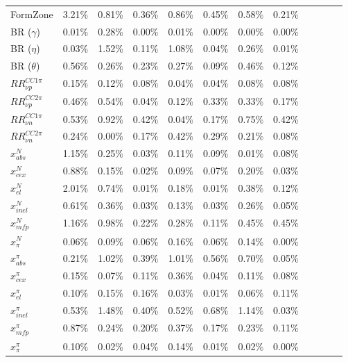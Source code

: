 \begin{table*}
\begin{tabular}{| l | l | l | l | l | l | l | l | l | l | l | l | }
FormZone  & 3.21\% &  0.81\% &  0.36\% &  0.86\% &  0.45\% &  0.58\% &  0.21\% \\
BR ($\gamma$) & 0.01\% &  0.28\% &  0.00\% &  0.01\% &  0.00\% &  0.00\% &  0.00\% \\
BR ($\eta$) &0.03\% &  1.52\% &  0.11\% &  1.08\% &  0.04\% &  0.26\% &  0.01\% \\
BR ($\theta$) & 0.56\% &  0.26\% &  0.23\% &  0.27\% &  0.09\% &  0.46\% &  0.12\% \\ \hline

$RR_{\nu p}^{CC1\pi}$ & 0.15\% &  0.12\% &  0.08\% &  0.04\% &  0.04\% &  0.08\% &  0.08\% \\ 
$RR_{\nu p}^{CC2\pi}$ & 0.46\% &  0.54\% &  0.04\% &  0.12\% &  0.33\% &  0.33\% &  0.17\% \\
$RR_{\nu n}^{CC1\pi}$ & 0.53\% &  0.92\% &  0.42\% &  0.04\% &  0.17\% &  0.75\% &  0.42\% \\ 
$RR_{\nu n}^{CC2\pi}$ & 0.24\% &  0.00\% &  0.17\% &  0.42\% &  0.29\% &  0.21\% &  0.08\% \\ \hline

$x_{abs}^{N}$ & 1.15\% &  0.25\% &  0.03\% &  0.11\% &  0.09\% &  0.01\% &  0.08\%\\
$x_{cex}^{N}$ & 0.88\% &  0.15\% &  0.02\% &  0.09\% &  0.07\% &  0.20\% &  0.03\% \\
$x_{el}^{N}$ & 2.01\% &  0.74\% &  0.01\% &  0.18\% &  0.01\% &  0.38\% &  0.12\% \\
$x_{inel}^{N}$ & 0.61\% &  0.36\% &  0.03\% &  0.13\% &  0.03\% &  0.26\% &  0.05\% \\
$x_{mfp}^{N}$ & 1.16\% &  0.98\% &  0.22\% &  0.28\% &  0.11\% &  0.45\% &  0.45\% \\
$x_{\pi}^{N}$ & 0.06\% &  0.09\% &  0.06\% &  0.16\% &  0.06\% &  0.14\% &  0.00\%  \\
$x_{abs}^{\pi}$ & 0.21\% &  1.02\% &  0.39\% &  1.01\% &  0.56\% &  0.70\% &  0.05\% \\
$x_{cex}^{\pi}$ & 0.15\% &  0.07\% &  0.11\% &  0.36\% &  0.04\% &  0.11\% &  0.08\% \\
$x_{el}^{\pi}$ &0.10\% &  0.15\% &  0.16\% &  0.03\% &  0.01\% &  0.06\% &  0.11\%\\
$x_{inel}^{\pi}$ & 0.53\% &  1.48\% &  0.40\% &  0.52\% &  0.68\% &  1.14\% &  0.03\%  \\
$x_{mfp}^{\pi}$ & 0.87\% &  0.24\% &  0.20\% &  0.37\% &  0.17\% &  0.23\% &  0.11\% \\
$x_{\pi}^{\pi}$ & 0.10\% &  0.02\% &  0.04\% &  0.14\% &  0.01\% &  0.02\% &  0.00\% \\
\hline
\end{tabular}
\end{table*}


